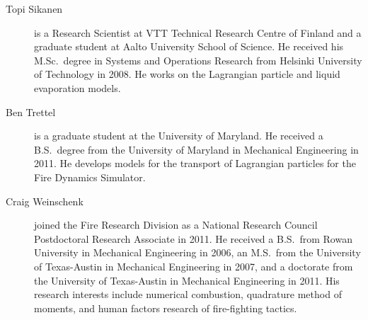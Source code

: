 \begin{description}
\item[Topi Sikanen] is a Research Scientist at VTT Technical Research Centre of Finland and a graduate student at Aalto University School of Science. He received his M.Sc.~degree in Systems and Operations Research from Helsinki University of Technology in 2008. He works on the Lagrangian particle and liquid evaporation models. 

\item[Ben Trettel] is a graduate student at the University of Maryland. He received a B.S.~degree from the University of Maryland in Mechanical Engineering in 2011. He develops models for the transport of Lagrangian particles for the Fire Dynamics Simulator.

\item[Craig Weinschenk] joined the Fire Research Division as a National Research Council Postdoctoral Research Associate in 2011. He received a B.S.~from Rowan University in Mechanical Engineering in 2006, an M.S.~from the University of Texas-Austin in Mechanical Engineering in 2007, and a doctorate from the University of Texas-Austin in Mechanical Engineering in 2011. His research interests include numerical combustion, quadrature method of moments, and human factors research of fire-fighting tactics.

\end{description}


